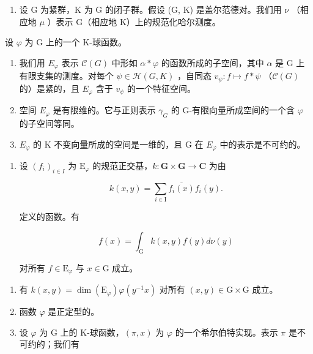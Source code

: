 \begin{enumerate}
\def\labelenumi{\arabic{enumi})}
\setcounter{enumi}{28}
\tightlist
\item
  设 G 为紧群，K 为 G 的闭子群。假设 (G, K) 是盖尔范德对。我们用 \(\nu\) （相应地 \(\mu\) ）表示 G（相应地 K）上的规范化哈尔测度。
\end{enumerate}

设 \(\varphi\) 为 G 上的一个 K-球函数。

\begin{enumerate}
\def\labelenumi{\alph{enumi})}
\item
  我们用 \(E_{\varphi}\) 表示 \(\mathcal{C}(G)\) 中形如 \(\alpha * \varphi\) 的函数所成的子空间，其中 \(\alpha\) 是 G 上有限支集的测度。对每个 \(\psi \in \mathcal{H}(G, K)\) ，自同态 \(v_{\psi}: f \mapsto f * \psi\) （\(\mathcal{C}(G)\) 的）是紧的，且 \(E_{\varphi}\) 含于 \(v_{\psi}\) 的一个特征空间。
\item
  空间 \(E_{\varphi}\) 是有限维的。它与正则表示 \(\gamma_{G}\) 的 G-有限向量所成空间的一个含 \(\varphi\) 的子空间等同。
\item
  \(E_{\varphi}\) 的 K 不变向量所成的空间是一维的，且 G 在 \(E_{\varphi}\) 中的表示是不可约的。
\end{enumerate}

\begin{enumerate}
\def\labelenumi{\alph{enumi})}
\setcounter{enumi}{3}
\tightlist
\item
  设 \((f_i)_{i\in I}\) 为 \(\mathrm{E}_{\varphi}\) 的规范正交基，\(k\colon \mathbf{G}\times \mathbf{G}\to \mathbf{C}\) 为由

\[
k (x, y) = \sum_ {i \in \mathrm{I}} \overline {{f _ {i} (x)}} f _ {i} (y).
\]

定义的函数。有

\[
f (x) = \int_ {\mathrm{G}} k (x, y) f (y) d \nu (y)
\]

对所有 \(f \in \mathrm{E}_{\varphi}\) 与 \(x \in \mathrm{G}\) 成立。

\end{enumerate}

\begin{enumerate}
\def\labelenumi{\alph{enumi})}
\setcounter{enumi}{4}
\item
  有 \(k(x,y)=\dim(\mathrm{E}_{\varphi})\varphi(y^{-1}x)\) 对所有 \((x,y)\in\mathrm{G}\times\mathrm{G}\) 成立。
\item
  函数 \(\varphi\) 是正定型的。
\item
  设 \(\varphi\) 为 G 上的 K-球函数，\((\pi, x)\) 为 \(\varphi\) 的一个希尔伯特实现。表示 \(\pi\) 是不可约的；我们有
\end{enumerate}

